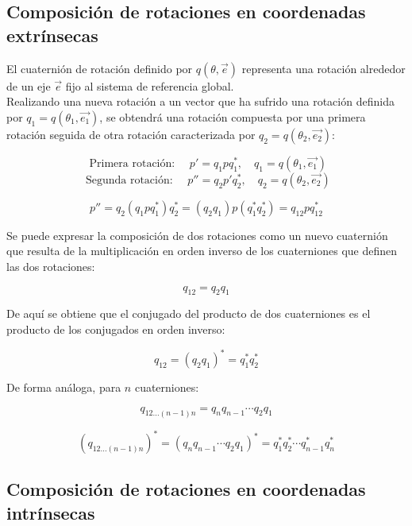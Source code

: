 \documentclass[10pt, a4paper]{report}
\begin{document}
\subsection{Composición de rotaciones en coordenadas extrínsecas}

El cuaternión de rotación definido por $q\left(\theta, \vec{e}\right)$ representa una rotación alrededor de un eje $\vec{e}$ fijo al sistema de referencia global.\\

Realizando una nueva rotación a un vector que ha sufrido una rotación definida por $q_1 = q\left(\theta_1, \vec{e_1}\right)$, se obtendrá una rotación compuesta por una primera rotación seguida de otra rotación caracterizada por $q_2 = q\left(\theta_2, \vec{e_2} \right)$:

$$ \text{ Primera rotación: } \quad p' = q_1pq_1^*, \quad q_1 = q(\theta_1, \vec{e_1}) $$
$$ \text{ Segunda rotación: }\quad p'' = q_2p'q_2^*, \quad q_2 = q(\theta_2, \vec{e_2}) $$

\begin{equation}
p'' = q_2(q_1pq_1^*)q_2^* = (q_2q_1)p(q_1^*q_2^*) = q_{12}pq_{12}^*
\end{equation}

Se puede expresar la composición de dos rotaciones como un nuevo cuaternión que resulta de la multiplicación en orden inverso de los cuaterniones que definen las dos rotaciones:

\begin{equation}
q_{12} = q_2 q_1
\end{equation}

De aquí se obtiene que el conjugado del producto de dos cuaterniones es el producto de los conjugados en orden inverso:

\begin{equation}
q_{12} = \left(q_2q_1\right)^* = q_1^*q_2^*
\end{equation}

De forma análoga, para $n$ cuaterniones:

\begin{equation}
q_{12 \dotsc (n-1)n} = q_nq_{n-1} \dotsm q_2q_1
\end{equation}

\begin{equation}
\left( q_{12 \dotsc (n-1)n} \right)^* = \left( q_nq_{n-1} \dotsm q_2q_1 \right)^* = q_1^*q_2^* \dotsm q_{n-1}^*q_n^*
\end{equation}

\subsection{Composición de rotaciones en coordenadas intrínsecas}
\end{document}
